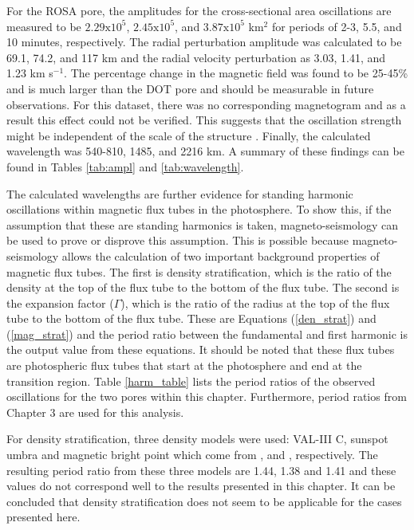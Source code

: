 	For the ROSA pore, the amplitudes for the cross-sectional area oscillations are measured to be $2.29\mathrm{x}10^5$, $2.45\mathrm{x}10^5$, and $3.87\mathrm{x}10^5$ km$^2$ for periods of 2-3, 5.5, and 10 minutes, respectively.
    The radial perturbation amplitude was calculated to be 69.1, 74.2, and 117 km and the radial velocity perturbation as 3.03, 1.41, and 1.23 km s$^{-1}$.
    The percentage change in the magnetic field was found to be  25-45\% and is much larger than the DOT pore and should be measurable in future observations. 
    For this dataset, there was no corresponding magnetogram and as a result this effect could not be verified.
    This suggests that the oscillation strength might be independent of the scale of the structure \citep{Dorotovic2014}. 
    Finally, the calculated wavelength was 540-810, 1485, and 2216 km.
    A summary of these findings can be found in Tables \ref{tab:ampl} and \ref{tab:wavelength}.
      
    The calculated wavelengths are further evidence for standing harmonic oscillations within magnetic flux tubes in the photosphere.
    To show this, if the assumption that these are standing harmonics is taken, magneto-seismology can be used to prove or disprove this assumption.
    This is possible because magneto-seismology allows the calculation of two important background properties of magnetic flux tubes.
    The first is density stratification, which is the ratio of the density at the top of the flux tube to the bottom of the flux tube.
    The second is the expansion factor ($\Gamma$), which is the ratio of the radius at the top of the flux tube to the bottom of the flux tube.
    These are Equations (\ref{den_strat}) and (\ref{mag_strat}) and the period ratio between the fundamental and first harmonic is the output value from these equations.
    It should be noted that these flux tubes are photospheric flux tubes that start at the photosphere and end at the transition region.
    Table \ref{harm_table} lists the period ratios of the observed oscillations for the two pores within this chapter.
    Furthermore, period ratios from Chapter 3 are used for this analysis.

	For density stratification, three density models were used: VAL-III C, sunspot umbra and magnetic bright point which come from \cite{1981ApJS...45..635V}, \cite{Maltby1986} and \cite{GFME13a,GFE14}, respectively.
	The resulting period ratio from these three models are 1.44, 1.38 and 1.41 and these values do not correspond well to the results presented in this chapter.
	It can be concluded that density stratification does not seem to be applicable for the cases presented here.

